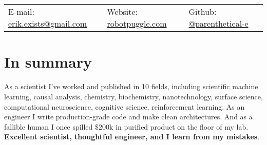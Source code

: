 \documentclass[margin,line]{res}
\begin{document}
\newcommand{\link}[1]{\texttt{#1}}
\providecommand{\tightlist}{%
    \setlength{\itemsep}{0pt}\setlength{\parskip}{0pt}}



\begin{resume}
\section{\sc }
\vspace{.05in}

\begin{tabular}{@{}p{2in}p{2in}p{2in}}
{E-mail:}  {\href{mailto:erik.exists@gmail.com}{erik.exists@gmail.com}} & {Website:} \href{http://robotpuggle.com}{robotpuggle.com} & {Github:} \href{https://github.com/parenthetical-e/}{@parenthetical-e} \\
\end{tabular}

\vspace{-.4cm}
\section{\sc In summary}
As a scientist I've worked and published in 10 fields, including scientific machine learning, causal analysis, chemistry,  biochemistry, nanotechnology, surface science, computational neuroscience, cognitive science, reinforcement learning. As an engineer I write production-grade code and make clean architectures. And as a fallible human I once spilled \$200k in purified product on the floor of my lab. \textbf{Excellent scientist, thoughtful engineer, and I learn from my mistakes}.



\vspace{-.35cm}

\end{resume}
\end{document}
